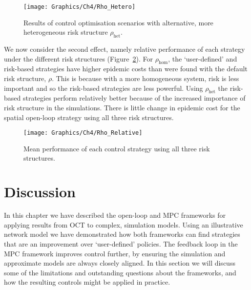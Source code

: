 \begin{figure}
    \begin{center}
        \texttt{[image: Graphics/Ch4/Rho\_Hetero]}
        \caption[Control strategy performance with more heterogeneous risk structure]{Results of control optimisation scenarios with alternative, more heterogeneous risk structure $\rho_{\mathrm{het}}$.}
        \label{fig:ch4:rho_hetero}
    \end{center}
\end{figure}

We now consider the second effect, namely relative performance of each strategy under the different risk structures (Figure~\ref{fig:ch4:rho_relative}). For $\rho_{\mathrm{hom}}$, the `user-defined' and risk-based strategies have higher epidemic costs than were found with the default risk structure, $\rho$. This is because with a more homogeneous system, risk is less important and so the risk-based strategies are less powerful. Using $\rho_{\mathrm{het}}$ the risk-based strategies perform relatively better because of the increased importance of risk structure in the simulations. There is little change in epidemic cost for the spatial open-loop strategy using all three risk structures.

\begin{figure}
    \begin{center}
        \texttt{[image: Graphics/Ch4/Rho\_Relative]}
        \caption[Comparing control performance across risk structures]{Mean performance of each control strategy using all three risk structures.}
        \label{fig:ch4:rho_relative}
    \end{center}
\end{figure}

\FloatBarrier

\section{Discussion}\label{sec:ch4:Discussion}

In this chapter we have described the open-loop and MPC frameworks for applying results from OCT to complex, simulation models. Using an illustrative network model we have demonstrated how both frameworks can find strategies that are an improvement over `user-defined' policies. The feedback loop in the MPC framework improves control further, by ensuring the simulation and approximate models are always closely aligned. In this section we will discuss some of the limitations and outstanding questions about the frameworks, and how the resulting controls might be applied in practice.

